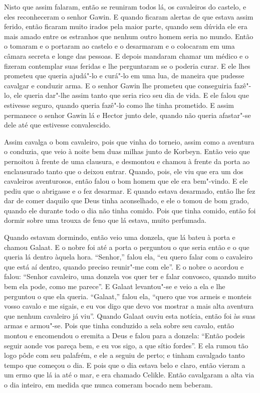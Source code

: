 Nisto que assim falaram, então se reuniram todos lá, os cavaleiros do castelo, e
eles reconheceram o senhor Gawin. E quando ficaram alertas de que estava assim
ferido, então ficaram muito irados pela maior parte, quando sem dúvida ele era
mais amado entre os estranhos que nenhum outro homem seria no mundo. Então o
tomaram e o portaram ao castelo e o desarmaram e o colocaram em uma câmara
secreta e longe das pessoas. E depois mandaram chamar um médico e o fizeram
contemplar suas feridas e lhe perguntaram se o poderia curar. E ele lhes
prometeu que queria ajudá"-lo e curá"-lo em uma lua, de maneira que pudesse
cavalgar e conduzir arma. E o senhor Gawin lhe prometeu que conseguiria
fazê"-lo, ele queria dar"-lhe assim tanto que seria rico seu dia de vida. E ele
falou que estivesse seguro, quando queria fazê"-lo como lhe tinha prometido. E
assim permanece o senhor Gawin lá e Hector junto dele, quando não queria
afastar"-se dele até que estivesse convalescido.

Assim cavalga o bom cavaleiro, pois que vinha do torneio, assim como a aventura
o conduzia, que veio à noite bem duas milhas junto de Korbeyn. Então veio que
pernoitou à frente de uma clausura, e desmontou e chamou à frente da porta ao
enclausurado tanto que o deixou entrar. Quando, pois, ele viu que era um dos
cavaleiros aventurosos, então falou o bom homem que ele era bem"-vindo. E ele
pediu que o abrigasse e o fez desarmar. E quando estava desarmado, então lhe
fez dar de comer daquilo que Deus tinha aconselhado, e ele o tomou de bom
grado, quando ele durante todo o dia não tinha comido. Pois que tinha comido,
então foi dormir sobre uma trouxa de feno que lá estava, muito perfumada. 

Quando estavam dormindo, então veio uma donzela, que lá bateu à porta e chamou
Galaat. E o nobre foi até a porta o perguntou o que seria então e o que queria
lá dentro àquela hora. “Senhor,” falou ela, “eu quero falar com o cavaleiro que
está aí dentro, quando preciso reunir"-me com ele”. E o nobre o acordou e falou:
“Senhor cavaleiro, uma donzela vos quer ter e falar convosco, quando muito bem
ela pode, como me parece”. E Galaat levantou"-se e veio a ela e lhe perguntou o
que ela queria. “Galaat,” falou ela, “quero que vos armeis e monteis vosso
cavalo e me sigais, e eu vos digo que devo vos mostrar a mais alta aventura que
nenhum cavaleiro já viu”. Quando Galaat ouviu esta notícia, então foi às suas
armas e armou"-se. Pois que tinha conduzido a sela sobre seu cavalo, então
montou e encomendou o eremita a Deus e falou para a donzela: “Então podeis
seguir aonde vos pareça bem, e eu vos sigo, a que sítio fordes”. E ela rumou tão
logo pôde com seu palafrém, e ele a seguiu de perto; e tinham cavalgado tanto
tempo que começou o dia. E pois que o dia estava belo e claro, então vieram a
um ermo que lá ia até o mar, e era chamado Celikle. Então cavalgaram a alta via
o dia inteiro, em medida que nunca comeram bocado nem beberam. 

